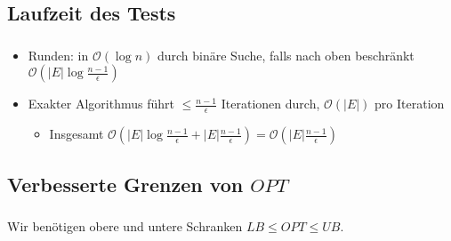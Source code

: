\documentclass{beamer}
\newcommand{\trianglearrow}{{\tiny\usebeamercolor[bg]{block title} \raisebox{.5ex}{$\blacktriangleright$} }} %
\begin{document}
\subsection{Laufzeit des Tests}

\begin{frame}
   \frametitle{\insertsection}
   \framesubtitle{\insertsubsection}
   \begin{itemize}
      \item Runden: in $\mathcal{O}(\log{n})$ durch binäre Suche, falls nach
         oben beschränkt \trianglearrow $\mathcal{O}\left(|E|\log{\frac{n-1}{\epsilon}}\right)$
      \item Exakter Algorithmus führt $\le \frac{n-1}{\epsilon}$ Iterationen
         durch, $\mathcal{O}\left(|E|\right)$ pro Iteration
         \begin{itemize}
            \item Insgesamt $\mathcal{O}\left(|E|\log{\frac{n-1}{\epsilon}} + |E|\frac{n-1}{\epsilon}\right) = \mathcal{O}\left(|E|\frac{n-1}{\epsilon}\right)$
         \end{itemize}
   \end{itemize}

\end{frame}

\subsection{Verbesserte Grenzen von $OPT$}

\begin{frame}
   \frametitle{\insertsection}
   \framesubtitle{\insertsubsection}
   Wir benötigen obere und untere Schranken $LB \le OPT \le UB$.
  
\end{frame}
\end{document}
